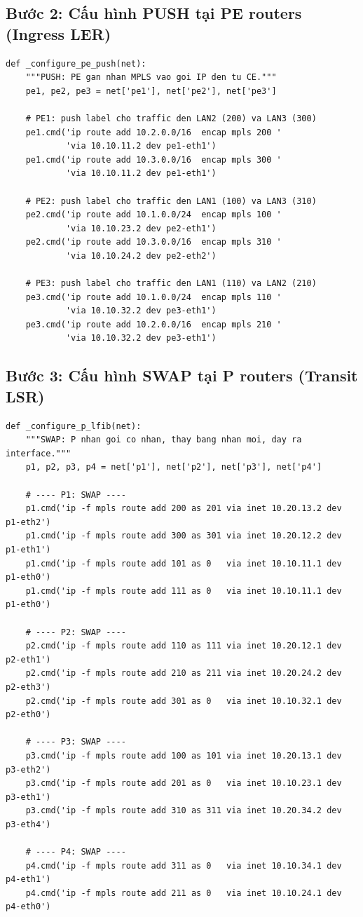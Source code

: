 \subsection{Bước 2: Cấu hình PUSH tại PE routers (Ingress LER)}

\begin{lstlisting}[style=pythonstyle, caption={Cấu hình PUSH tại PE1, PE2, PE3}]
def _configure_pe_push(net):
    """PUSH: PE gan nhan MPLS vao goi IP den tu CE."""
    pe1, pe2, pe3 = net['pe1'], net['pe2'], net['pe3']

    # PE1: push label cho traffic den LAN2 (200) va LAN3 (300)
    pe1.cmd('ip route add 10.2.0.0/16  encap mpls 200 '
            'via 10.10.11.2 dev pe1-eth1')
    pe1.cmd('ip route add 10.3.0.0/16  encap mpls 300 '
            'via 10.10.11.2 dev pe1-eth1')

    # PE2: push label cho traffic den LAN1 (100) va LAN3 (310)
    pe2.cmd('ip route add 10.1.0.0/24  encap mpls 100 '
            'via 10.10.23.2 dev pe2-eth1')
    pe2.cmd('ip route add 10.3.0.0/16  encap mpls 310 '
            'via 10.10.24.2 dev pe2-eth2')

    # PE3: push label cho traffic den LAN1 (110) va LAN2 (210)
    pe3.cmd('ip route add 10.1.0.0/24  encap mpls 110 '
            'via 10.10.32.2 dev pe3-eth1')
    pe3.cmd('ip route add 10.2.0.0/16  encap mpls 210 '
            'via 10.10.32.2 dev pe3-eth1')
\end{lstlisting}

\subsection{Bước 3: Cấu hình SWAP tại P routers (Transit LSR)}

\begin{lstlisting}[style=pythonstyle, caption={Cấu hình SWAP LFIB tại P1, P2, P3, P4}]
def _configure_p_lfib(net):
    """SWAP: P nhan goi co nhan, thay bang nhan moi, day ra interface."""
    p1, p2, p3, p4 = net['p1'], net['p2'], net['p3'], net['p4']

    # ---- P1: SWAP ----
    p1.cmd('ip -f mpls route add 200 as 201 via inet 10.20.13.2 dev p1-eth2')
    p1.cmd('ip -f mpls route add 300 as 301 via inet 10.20.12.2 dev p1-eth1')
    p1.cmd('ip -f mpls route add 101 as 0   via inet 10.10.11.1 dev p1-eth0')
    p1.cmd('ip -f mpls route add 111 as 0   via inet 10.10.11.1 dev p1-eth0')

    # ---- P2: SWAP ----
    p2.cmd('ip -f mpls route add 110 as 111 via inet 10.20.12.1 dev p2-eth1')
    p2.cmd('ip -f mpls route add 210 as 211 via inet 10.20.24.2 dev p2-eth3')
    p2.cmd('ip -f mpls route add 301 as 0   via inet 10.10.32.1 dev p2-eth0')

    # ---- P3: SWAP ----
    p3.cmd('ip -f mpls route add 100 as 101 via inet 10.20.13.1 dev p3-eth2')
    p3.cmd('ip -f mpls route add 201 as 0   via inet 10.10.23.1 dev p3-eth1')
    p3.cmd('ip -f mpls route add 310 as 311 via inet 10.20.34.2 dev p3-eth4')

    # ---- P4: SWAP ----
    p4.cmd('ip -f mpls route add 311 as 0   via inet 10.10.34.1 dev p4-eth1')
    p4.cmd('ip -f mpls route add 211 as 0   via inet 10.10.24.1 dev p4-eth0')
\end{lstlisting}


